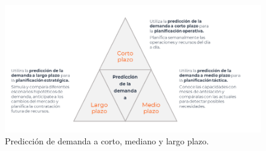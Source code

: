 \begin{figure}[H]
  \begin{center}
    \includegraphics[scale=0.70]{./proceso_CMD_plazo.png}
    \caption{Predicción de demanda a corto, mediano y largo plazo\cite{decide}.}
    \label{fig:proceso_inventario}
  \end{center}
\end{figure}

